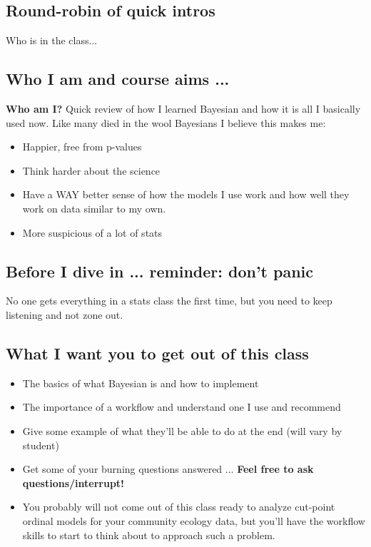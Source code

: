 \documentclass[11pt]{article}
\begin{document}
\subsection{Round-robin of quick intros}
Who is in the class...

\subsection{Who I am and course aims ...}

{\bf Who am I?} Quick review of how I learned Bayesian and how it is all I basically used now. Like many died in the wool Bayesians I believe this makes me: 
\begin{itemize}
\item Happier, free from p-values
\item Think harder about the science
\item Have a WAY better sense of how the models I use work and how well they work on data similar to my own. 
\item More suspicious of a lot of stats
\end{itemize}

\subsection{Before I dive in ... reminder: don't panic} %
No one gets everything in a stats class the first time, but you need to keep listening and not zone out.

\subsection{What I want you to get out of this class} 
\begin{itemize}
\item The basics of what Bayesian is and how to implement
\item The importance of a workflow and understand one I use and recommend
\item Give some example of what they'll be able to do at the end (will vary by student)
\item Get some of your burning questions answered ... {\bf Feel free to ask questions/interrupt!}
\item You probably will not come out of this class ready to analyze cut-point ordinal models for your community ecology data, but you'll have the workflow skills to start to think about to approach such a problem. 
\end{itemize}
\end{document}
